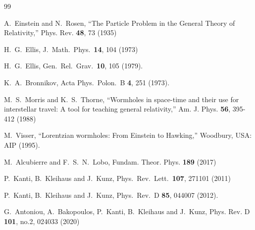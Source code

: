 \documentclass[a4paper,12pt]{article}
\begin{document}

\begin{thebibliography}{99}

%

A.~Einstein and N.~Rosen,
``The Particle Problem in the General Theory of Relativity,''
Phys. Rev. \textbf{48}, 73 (1935)

  H.~G.~Ellis,
  J.\ Math.\ Phys.\  {\bf 14}, 104 (1973)

  H.~G.~Ellis,
  Gen.\ Rel.\ Grav.\  {\bf 10}, 105 (1979).

  K.~A.~Bronnikov,
  Acta Phys.\ Polon.\ B {\bf 4}, 251 (1973).

M.~S.~Morris and K.~S.~Thorne,
``Wormholes in space-time and their use for interstellar travel: A tool for teaching general relativity,''
Am. J. Phys. \textbf{56}, 395-412 (1988)

  M.~Visser,
  ``Lorentzian wormholes: From Einstein to Hawking,''
  Woodbury, USA: AIP (1995).


M.~Alcubierre and F.~S.~N.~Lobo,
Fundam. Theor. Phys. \textbf{189} (2017) 

  P.~Kanti, B.~Kleihaus and J.~Kunz,
  Phys.\ Rev.\ Lett.\  {\bf 107}, 271101 (2011)

  P.~Kanti, B.~Kleihaus and J.~Kunz,
  Phys.\ Rev.\ D {\bf 85}, 044007 (2012).

G.~Antoniou, A.~Bakopoulos, P.~Kanti, B.~Kleihaus and J.~Kunz,
Phys. Rev. D \textbf{101}, no.2, 024033 (2020)


\end{thebibliography}
\end{document}
